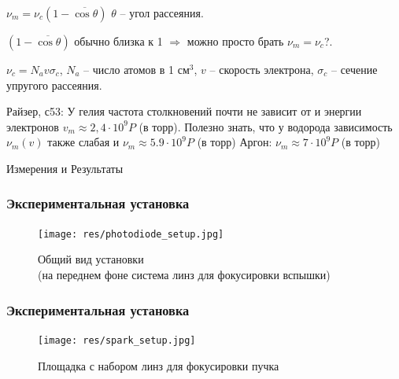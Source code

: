 \documentclass{beamer}
\begin{document}
	\begin{frame}
		$\nu_m = \nu_c (1 - \overline{\cos{\theta}})$
		$\theta$ -- угол рассеяния.
		
		$(1 - \overline{\cos{\theta}})$ обычно близка к 1 $\Rightarrow$ можно просто брать $\nu_m = \nu_c$?.
		
		$\nu_c = N_a v \sigma_c$, $N_a$ -- число атомов в 1 см$^3$, $v$ -- скорость электрона, $\sigma_c$ -- сечение упругого рассеяния.
		
		Райзер, с53: У гелия частота столкновений почти не зависит от и энергии электронов $v_m \approx 2,4\cdot 10^9 P$ (в торр). Полезно знать, что у водорода зависимость $\nu_m (v)$ также слабая и $\nu_m \approx 5.9 \cdot 10^9 P$ (в торр)
		Аргон: $\nu_m \approx 7 \cdot 10^9 P$ (в торр)
	\end{frame}
	
	\begin{frame}[plain,c]
		
		\begin{center}
			\huge {} Измерения и Результаты
		\end{center}
		
	\end{frame}
	
	
	\begin{frame}
		\frametitle{Экспериментальная установка}
		\begin{figure}
			\centering
			\texttt{[image: res/photodiode\_setup.jpg]}
			\caption*{Общий вид установки\\ \footnotesize (на переднем фоне система линз для фокусировки вспышки) }
		\end{figure}
	\end{frame}
	
	\begin{frame}
		\frametitle{Экспериментальная установка}
		\begin{figure}
			\centering
			\texttt{[image: res/spark\_setup.jpg]}
			\caption*{Площадка с набором линз для фокусировки пучка}
		\end{figure}
		
	\end{frame}
	
\end{document}
